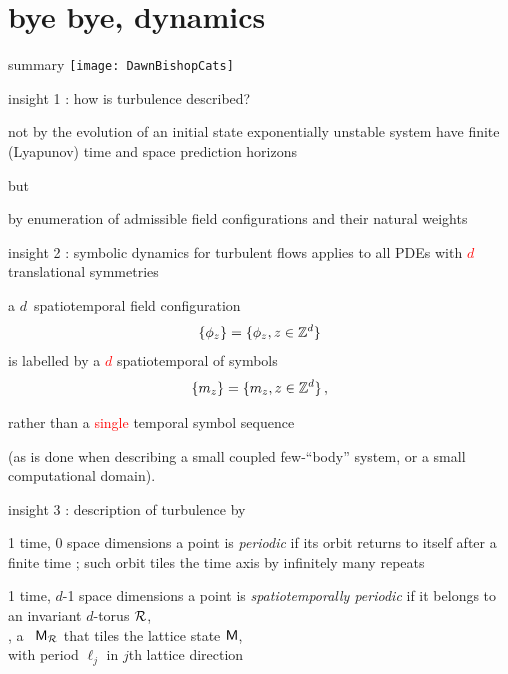 \section[bye bye, dynamics]
 {bye bye, dynamics}
\label{s:byeDynamics}


\begin{frame}{summary}
\catlatt\hfill\texttt{[image: DawnBishopCats]}
\end{frame}

\begin{frame}{insight 1 : how is turbulence described?}
\begin{block}{not by the evolution of an initial state}
exponentially unstable system have finite (Lyapunov) time and
space prediction horizons
\end{block}
but
\bigskip

\begin{block}{by enumeration of admissible field configurations}
and their natural weights
\end{block}
\end{frame}

\begin{frame}{insight 2 : symbolic dynamics for turbulent flows}
applies to
all PDEs with \textcolor{red}{$d$} translational symmetries

\bigskip

a $d$\dmn\ spatiotemporal field configuration
\[
\{\phi_{z}\} = \{\phi_{z},  z\in \mathbb{Z}^{d}  \}
\]
is labelled by a \textcolor{red}{$d$\dmn} {spatiotemporal
{\brick}} of symbols
\[
\{m_{z}\} = \{m_{z}, z\in \mathbb{Z}^{d}\}
\,,
\]

\bigskip

rather than a \textcolor{red}{single} temporal symbol sequence

\bigskip

(as is done when describing a small coupled few-``body'' system, or a
small computational domain).
\end{frame}


\begin{frame}{insight 3 : description of turbulence by \twots}
\begin{block}{1 time, 0 space dimensions}
a {\statesp} point is {\em periodic} if its orbit returns to itself
after a finite time \period{}; such orbit tiles the time axis
by infinitely many repeats
\end{block}

\bigskip

\begin{block}{1 time, $d$-1 space dimensions}
 a {\statesp} point is {\em spatiotemporally periodic} if
it belongs to \\ an invariant $d$-torus ${\mathcal{R}}$,\\
\ie, a \brick\ $\mathsf{M}_{\mathcal{R}}$ that
tiles the lattice state  $\mathsf{M}$, \\
with period $\ell_j$ in $j$th lattice direction
\end{block}
\end{frame}

